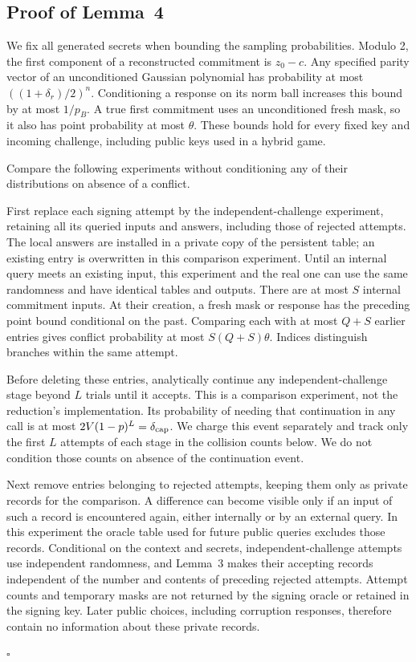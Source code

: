 \documentclass[lettersize,journal]{IEEEtran}
\newenvironment{proof}{{\noindent\it Proof:} }{\hfill $\square$\par}
\begin{document}
\subsection{Proof of Lemma~4}
\label{app:proof-rom-simulation}
\begin{proof}
	We fix all generated secrets when bounding the sampling probabilities. Modulo 2, the first component of a reconstructed commitment is $z_0-c$. Any specified parity vector of an unconditioned Gaussian polynomial has probability at most $((1+\delta_r)/2)^n$. Conditioning a response on its norm ball increases this bound by at most $1/p_B$. A true first commitment uses an unconditioned fresh mask, so it also has point probability at most $\theta$. These bounds hold for every fixed key and incoming challenge, including public keys used in a hybrid game.
	
	Compare the following experiments without conditioning any of their distributions on absence of a conflict.
	
	First replace each signing attempt by the independent-challenge experiment, retaining all its queried inputs and answers, including those of rejected attempts. The local answers are installed in a private copy of the persistent table; an existing entry is overwritten in this comparison experiment. Until an internal query meets an existing input, this experiment and the real one can use the same randomness and have identical tables and outputs. There are at most $S$ internal commitment inputs. At their creation, a fresh mask or response has the preceding point bound conditional on the past. Comparing each with at most $Q+S$ earlier entries gives conflict probability at most $S(Q+S)\theta$. Indices distinguish branches within the same attempt.
	
	Before deleting these entries, analytically continue any independent-challenge stage beyond $L$ trials until it accepts. This is a comparison experiment, not the reduction's implementation. Its probability of needing that continuation in any call is at most $2V(1-p)^L=\delta_{\rm cap}$. We charge this event separately and track only the first $L$ attempts of each stage in the collision counts below. We do not condition those counts on absence of the continuation event.
	
	Next remove entries belonging to rejected attempts, keeping them only as private records for the comparison. A difference can become visible only if an input of such a record is encountered again, either internally or by an external query. In this experiment the oracle table used for future public queries excludes those records. Conditional on the context and secrets, independent-challenge attempts use independent randomness, and Lemma~3 makes their accepting records independent of the number and contents of preceding rejected attempts. Attempt counts and temporary masks are not returned by the signing oracle or retained in the signing key. Later public choices, including corruption responses, therefore contain no information about these private records.
	

\end{proof}
\end{document}
